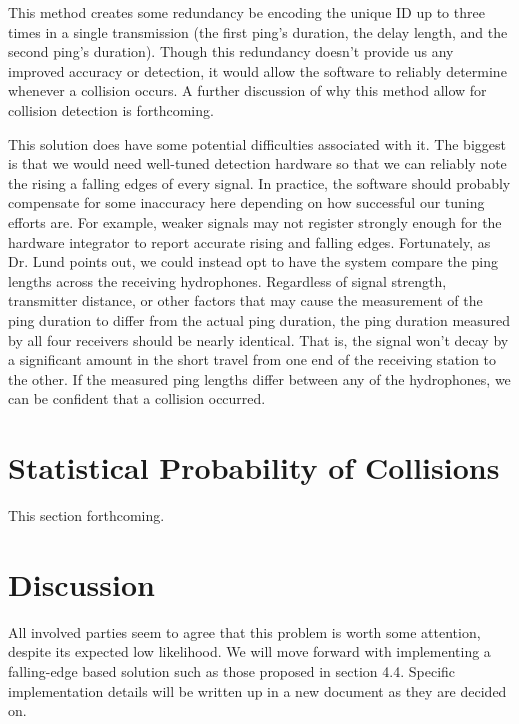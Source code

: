 \documentclass[12pt]{article}
\begin{document}
This method creates some redundancy be encoding the unique ID up to three times
in a single transmission
(the first ping's duration, the delay length, and the second ping's duration).
Though this redundancy doesn't provide us any improved accuracy or detection,
it would allow the software to reliably determine whenever a collision occurs.
A further discussion of why this method allow for collision detection is
forthcoming.


This solution does have some potential difficulties associated with it.
The biggest is that we would need well-tuned detection hardware so that we can
reliably note the rising a falling edges of every signal.
In practice, the software should probably compensate for some inaccuracy here
depending on how successful our tuning efforts are.
For example, weaker signals may not register strongly enough for the hardware
integrator to report accurate rising and falling edges.
Fortunately, as Dr. Lund points out, we could instead opt to have the system
compare the ping lengths across the receiving hydrophones.
Regardless of signal strength, transmitter distance, or other factors that
may cause the measurement of the ping duration to differ from the actual
ping duration, the ping duration measured by all four receivers should be
nearly identical. That is, the signal won't decay by a significant amount
in the short travel from one end of the receiving station to the other.
If the measured ping lengths differ between any of the hydrophones,
we can be confident that a collision occurred.

\section{Statistical Probability of Collisions}

This section forthcoming.

\section{Discussion}

All involved parties seem to agree that this problem is worth some attention,
despite its expected low likelihood.
We will move forward with implementing a falling-edge based solution such as
those proposed in section 4.4.
Specific implementation details will be written up in a new document as they
are decided on.
\end{document}
